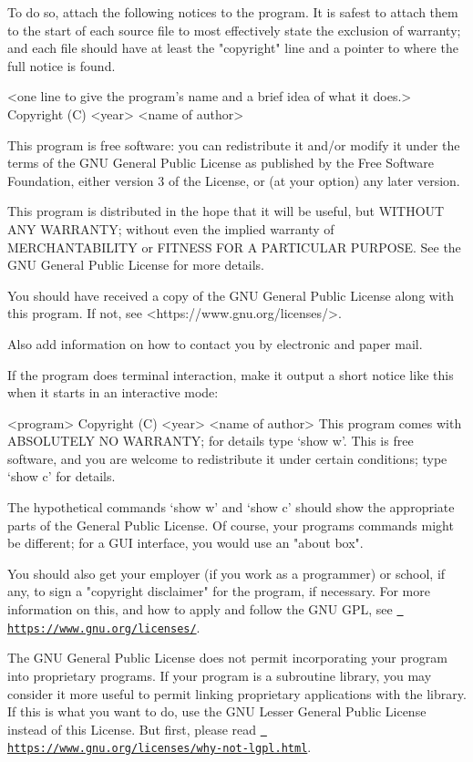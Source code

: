 To do so, attach the following notices to the program. It is safest to attach them to the start of each source file to most effectively state the exclusion of warranty; and each file should have at least the "{}copyright"{} line and a pointer to where the full notice is found. \begin{DoxyVerb}<one line to give the program's name and a brief idea of what it does.>
Copyright (C) <year>  <name of author>

This program is free software: you can redistribute it and/or modify
it under the terms of the GNU General Public License as published by
the Free Software Foundation, either version 3 of the License, or
(at your option) any later version.

This program is distributed in the hope that it will be useful,
but WITHOUT ANY WARRANTY; without even the implied warranty of
MERCHANTABILITY or FITNESS FOR A PARTICULAR PURPOSE.  See the
GNU General Public License for more details.

You should have received a copy of the GNU General Public License
along with this program.  If not, see <https://www.gnu.org/licenses/>.
\end{DoxyVerb}
 Also add information on how to contact you by electronic and paper mail.

If the program does terminal interaction, make it output a short notice like this when it starts in an interactive mode\+: \begin{DoxyVerb}<program>  Copyright (C) <year>  <name of author>
This program comes with ABSOLUTELY NO WARRANTY; for details type `show w'.
This is free software, and you are welcome to redistribute it
under certain conditions; type `show c' for details.
\end{DoxyVerb}
 The hypothetical commands `show w' and `show c' should show the appropriate parts of the General Public License. Of course, your program\textquotesingle{}s commands might be different; for a GUI interface, you would use an "{}about box"{}.

You should also get your employer (if you work as a programmer) or school, if any, to sign a "{}copyright disclaimer"{} for the program, if necessary. For more information on this, and how to apply and follow the GNU GPL, see \href{https://www.gnu.org/licenses/}{\texttt{ https\+://www.\+gnu.\+org/licenses/}}.

The GNU General Public License does not permit incorporating your program into proprietary programs. If your program is a subroutine library, you may consider it more useful to permit linking proprietary applications with the library. If this is what you want to do, use the GNU Lesser General Public License instead of this License. But first, please read \href{https://www.gnu.org/licenses/why-not-lgpl.html}{\texttt{ https\+://www.\+gnu.\+org/licenses/why-\/not-\/lgpl.\+html}}. 